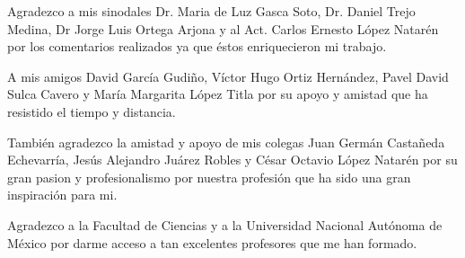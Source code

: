\documentclass[letterpaper,twoside,openright]{book}
\begin{document}
Agradezco a mis sinodales Dr. Maria de Luz Gasca Soto, Dr. Daniel Trejo Medina, Dr
Jorge Luis Ortega Arjona y al Act. Carlos Ernesto López Natarén por los comentarios
realizados ya que éstos enriquecieron mi trabajo.

A mis amigos David García Gudiño, Víctor Hugo Ortiz Hernández, Pavel David Sulca
Cavero y María Margarita López Titla por su apoyo y amistad que ha resistido el
tiempo y distancia.

También agradezco la amistad y apoyo de mis colegas Juan Germán Castañeda Echevarría,
Jesús Alejandro Juárez Robles y César Octavio López Natarén por su gran pasion y
profesionalismo por nuestra profesión que ha sido una gran inspiración para mi.

Agradezco a la Facultad de Ciencias y a la Universidad Nacional Autónoma de México
por darme acceso a tan excelentes profesores que me han formado.

\tableofcontents

\mainmatter








\backmatter



\printbibliography
\end{document}
